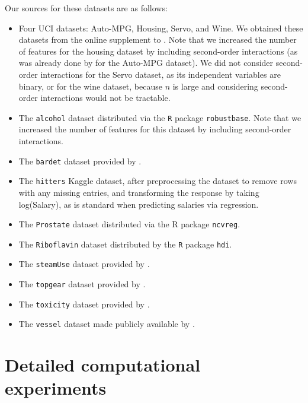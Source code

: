 \documentclass[mnsc,nonblindrev]{informs3} %
\begin{document}
Our sources for these datasets are as follows:
\begin{itemize}
    \item Four UCI datasets: Auto-MPG, Housing, Servo, and Wine. We obtained these datasets from the online supplement to \cite{gomez2021mixed}. Note that we increased the number of features for the housing dataset by including second-order interactions (as was already done by \cite{gomez2021mixed} for the Auto-MPG dataset). We did not consider second-order interactions for the Servo dataset, as its independent variables are binary, or for the wine dataset, because $n$ is large and considering second-order interactions would not be tractable.
    \item The \verb|alcohol| dataset distributed via the \verb|R| package \verb|robustbase|. Note that we increased the number of features for this dataset by including second-order interactions.
    \item The \verb|bardet| dataset provided by \cite{ye2018sparsity}.
    \item The \verb|hitters| Kaggle dataset, after preprocessing the dataset to remove rows with any missing entries, and transforming the response by taking log(Salary), as is standard when predicting salaries via regression.
    \item The \verb|Prostate| dataset %
    distributed via the R package \verb|ncvreg|.
    \item The \verb|Riboflavin| dataset distributed by the \verb|R| package \verb|hdi|.
    \item The \verb|steamUse| dataset provided by \cite{rousseeuw2009robustbase}.
    \item The \verb|topgear| dataset provided by \cite{bottmer2022sparse}.
    \item The \verb|toxicity| dataset provided by \cite{rousseeuw2009robustbase}.
    \item The \verb|vessel| dataset made publicly available by \cite{christidis2020split}.
\end{itemize}

\section{Detailed computational experiments}\label{sec:compTable}
\end{document}
